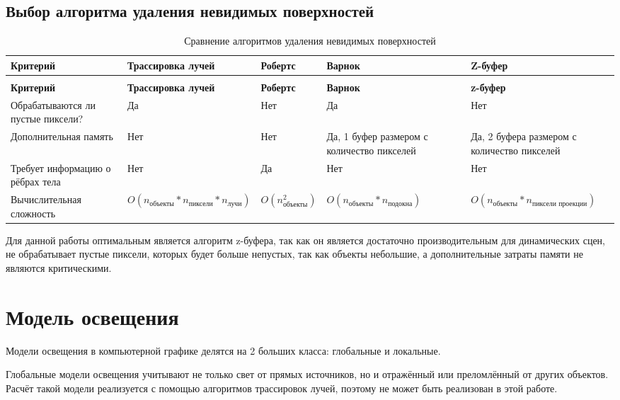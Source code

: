 \subsection{Выбор алгоритма удаления невидимых поверхностей}

\begin{longtable}{|p{}|p{}|p{}|p{}|p{}|}
	\caption{Сравнение алгоритмов удаления невидимых поверхностей} \label{tbl:invisible} 
	\\
	\hline
	\textbf{Критерий} & \textbf{Трассировка лучей} & \textbf{Робертс} & \textbf{Варнок} & \textbf{Z-буфер} \\
	\hline
	\endfirsthead
	\caption{Сравнение алгоритмов удаления невидимых поверхностей}
	\\
	\hline
	\textbf{Критерий} & \textbf{Трассировка лучей} & \textbf{Робертс} & \textbf{Варнок} & \textbf{z-буфер} \\
	\hline
	\endhead
	\hline
	\endfoot
	\endlastfoot
	Обрабатываются ли пустые пиксели? & Да & Нет & Да & Нет \\
	\hline
	Дополнительная память & Нет & Нет & Да, 1 буфер размером с количество пикселей & Да, 2 буфера размером с количество пикселей \\
	\hline
	Требует информацию о рёбрах тела & Нет & Да & Нет & Нет \\
	\hline
	Вычислительная сложность & $O(n_{\text{объекты}}*n_{\text{пиксели}} * n_{\text{лучи}})$ & $O(n_{\text{объекты}}^2)$ & $O(n_{\text{объекты}}*n_{\text{подокна}})$ & $O(n_{\text{объекты}}*n_{\text{пиксели проекции}})$ \\
	\hline
\end{longtable}


Для данной работы оптимальным является алгоритм z-буфера, так как он является достаточно производительным для динамических сцен, не обрабатывает пустые пиксели, которых будет больше непустых, так как объекты небольшие, а дополнительные затраты памяти не являются критическими.


\section{Модель освещения}
Модели освещения в компьютерной графике делятся на 2 больших класса: глобальные и локальные.

Глобальные модели освещения учитывают не только свет от прямых источников, но и отражённый или преломлённый от других объектов. Расчёт такой модели реализуется с помощью алгоритмов трассировок лучей, поэтому не может быть реализован в этой работе.

